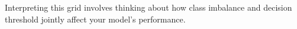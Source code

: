 

Interpreting this grid involves thinking about how class imbalance and decision threshold jointly affect your model’s performance.